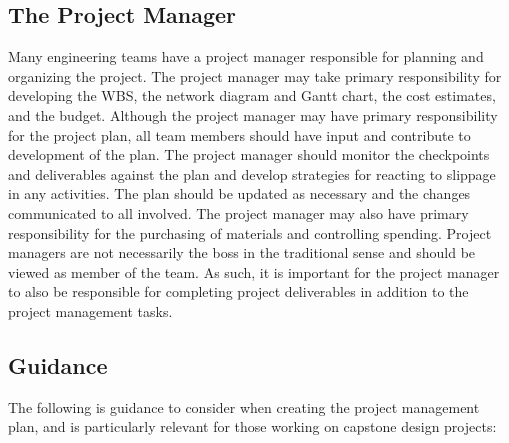 \subsection{The Project Manager}\label{the-project-manager}

Many engineering teams have a project manager responsible for planning
and organizing the project. The project manager may take primary
responsibility for developing the WBS, the network diagram and Gantt
chart, the cost estimates, and the budget. Although the project manager
may have primary responsibility for the project plan, all team members
should have input and contribute to development of the plan. The project
manager should monitor the checkpoints and deliverables against the plan
and develop strategies for reacting to slippage in any activities. The
plan should be updated as necessary and the changes communicated to all
involved. The project manager may also have primary responsibility for
the purchasing of materials and controlling spending. Project managers
are not necessarily the boss in the traditional sense and should be
viewed as member of the team. As such, it is important for the project
manager to also be responsible for completing project deliverables in
addition to the project management tasks.

\subsection{Guidance}\label{guidance}

The following is guidance to consider when creating the project
management plan, and is particularly relevant for those working on
capstone design projects:

